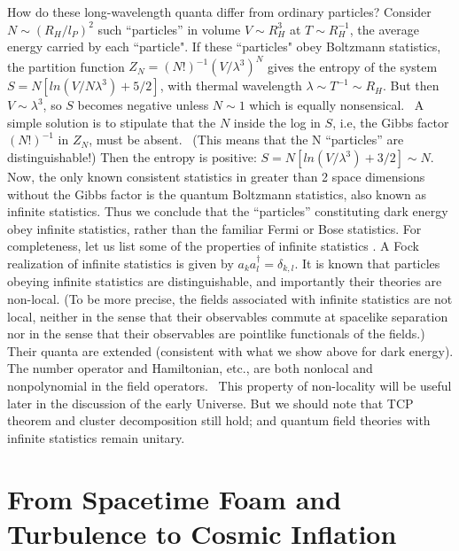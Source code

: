\documentclass[12pt]{article}
\begin{document}
How do these long-wavelength quanta differ from ordinary particles?
Consider $N \sim (R_H/l_P)^2$ such ``particles'' 
in volume $V \sim R_H^3$ at $T \sim
R_H^{-1}$, the average energy carried by each ``particle".  If these ``particles" 
obey Boltzmann statistics,
the partition function $Z_N = (N!)^{-1} (V / \lambda^3)^N$ gives
the entropy of the system $S = N [ln (V / N \lambda^3) + 5/2]$,
with thermal wavelength $\lambda \sim T^{-1} \sim R_H$.
But then $V \sim \lambda^3$, so $S$ becomes negative unless $N \sim 1$
which is equally nonsensical.  A simple solution is to stipulate that
the $N$ inside the log in $S$, i.e, the Gibbs factor
$(N!)^{-1}$ in $Z_N$, must be absent.  (This means that
the N ``particles'' are distinguishable!)
Then the entropy is positive: $S = N[ln (V/ \lambda^3) + 3/2] \sim N$. Now,
the only known consistent statistics in greater than 2 space dimensions
without the Gibbs factor is the quantum Boltzmann statistics, also known as
infinite statistics. \cite{DHR,greenberg} 
Thus we conclude that the ``particles'' constituting dark energy
obey infinite statistics, rather than the familiar Fermi or Bose
statistics. \cite{plb,minic}
For completeness, let us list some of the properties of
infinite statistics \cite{DHR,greenberg}.
A Fock realization of infinite statistics
is given by $a_k a^{\dagger}_l = \delta_{k,l}$.
It is known that particles obeying infinite statistics are distinguishable, and 
importantly their theories are non-local. \cite{fredenhagen,greenberg}
(To be more precise, the fields
associated with infinite statistics are not local, neither in the sense
that their observables commute at spacelike separation nor in the sense
that their observables are pointlike functionals of the fields.)
Their quanta are extended (consistent with what we show above for dark energy).
The number operator and Hamiltonian, etc.,
are both nonlocal and nonpolynomial in the field operators.  
This property of non-locality will be useful later in the discussion of the early Universe. 
But we should note that
TCP theorem and cluster decomposition still hold; and quantum field
theories with infinite statistics remain unitary. \cite{greenberg}\\


\section{From Spacetime Foam and Turbulence to Cosmic Inflation}
\end{document}
